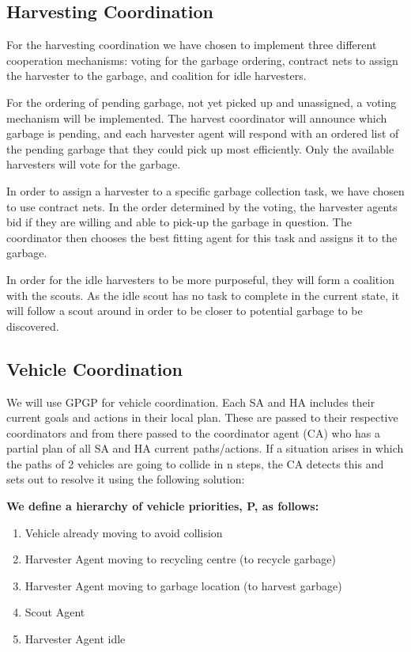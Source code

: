 \subsection{Harvesting Coordination}

For the harvesting coordination we have chosen to implement three different cooperation mechanisms: voting for the garbage ordering, contract nets to assign the harvester to the garbage, and coalition for idle harvesters. 

For the ordering of pending garbage, not yet picked up and unassigned, a voting mechanism will be implemented. The harvest coordinator will announce which garbage is pending, and each harvester agent will respond with an ordered list of the pending garbage that they could pick up most efficiently. Only the available harvesters will vote for the garbage. 

In order to assign a harvester to a specific garbage collection task, we have chosen to use contract nets. In the order determined by the voting, the harvester agents bid if they are willing and able to pick-up the garbage in question. The coordinator then chooses the best fitting agent for this task and assigns it to the garbage. 

In order for the idle harvesters to be more purposeful, they will form a coalition with the scouts. As the idle scout has no task to complete in the current state, it will follow a scout around in order to be closer to potential garbage to be discovered. 

\subsection{Vehicle Coordination}

We will use GPGP for vehicle coordination. Each SA and HA includes their current goals and actions in their local plan. These are passed to their respective coordinators and from there passed to the coordinator agent (CA) who has a partial plan of all SA and HA current paths/actions. If a situation arises in which the paths of 2 vehicles are going to collide in n steps, the CA detects this and sets out to resolve it using the following solution:

\textbf{We define a hierarchy of vehicle priorities, P, as follows:}

\begin{enumerate}
	\item Vehicle already moving to avoid collision
	\item Harvester Agent moving to recycling centre (to recycle garbage)
	\item Harvester Agent moving to garbage location (to harvest garbage)
	\item Scout Agent 
	\item Harvester Agent idle 
\end{enumerate}

